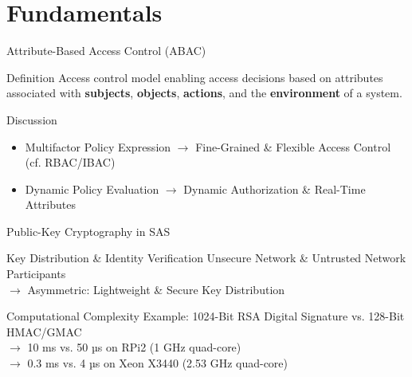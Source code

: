 \documentclass[en]{sdqbeamer}
\begin{document}
\section{Fundamentals}
\begin{frame}{Attribute-Based Access Control (ABAC)}
    \begin{greenblock}{Definition \parencite{JTF2020}}
        Access control model enabling access decisions based on attributes associated with \textbf{subjects}, \textbf{objects}, \textbf{actions}, and the \textbf{environment} of a system.
    \end{greenblock}
    \begin{blueblock}{Discussion \parencite{Hu2014}}
        \begin{itemize}
            \item Multifactor Policy Expression $\rightarrow$ Fine-Grained \& Flexible Access Control (cf. RBAC/IBAC)
            \item Dynamic Policy Evaluation $\rightarrow$ Dynamic Authorization \& Real-Time Attributes
        \end{itemize}
    \end{blueblock}
\end{frame}
\begin{frame}{Public-Key Cryptography in SAS}
    \begin{blueblock}{Key Distribution \& Identity Verification}
        Unsecure Network \& Untrusted Network Participants
        \\$\rightarrow$ Asymmetric: Lightweight \& Secure Key Distribution
    \end{blueblock}
    \begin{blueblock}{Computational Complexity \parencite{Elbez2019,Ishchenko2018}}
        Example: 1024-Bit RSA Digital Signature vs. 128-Bit HMAC/GMAC
        \\$\rightarrow$ 10 ms vs. 50 µs on RPi2 (1 GHz quad-core)
        \\$\rightarrow$ 0.3 ms vs. 4 µs on Xeon X3440 (2.53 GHz quad-core) 
    \end{blueblock}
\end{frame}
\end{document}
